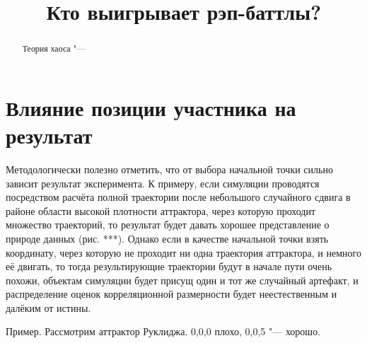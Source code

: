 \documentclass[final,pdftex]{../../template/epsilonj}
\begin{document}
	
	\begin{frontmatter}
		\title{Кто выигрывает рэп-баттлы?}
		
		\begin{aug}
			\author{ }%
			
			
			\address{НИУ ВШЭ, Москва.}
		\end{aug}
		
		\begin{abstract}
			Теория хаоса "--- 
		\end{abstract}
		
		\begin{keyword}
		\end{keyword}
		
	\end{frontmatter}
	
	
	\section{Влияние позиции участника на результат}

Методологически полезно отметить, что от выбора начальной точки сильно зависит результат эксперимента. К примеру, если симуляции проводятся посредством расчёта полной траектории после небольшого случайного сдвига в районе области высокой плотности аттрактора, через которую проходит множество траекторий, то результат будет давать хорошее представление о природе данных (рис. ***). Однако если в качестве начальной точки взять координату, через которую не проходит ни одна траектория аттрактора, и немного её двигать, то тогда результирующие траектории будут в начале пути очень похожи, объектам симуляции будет присущ один и тот же случайный артефакт, и распределение оценок корреляционной размерности будет неестественным и далёким от истины.

Пример. Рассмотрим аттрактор Руклиджа. 0,0,0  плохо, 0,0,5 "--- хорошо.
\end{document}
